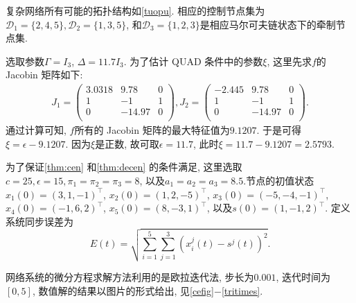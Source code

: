     复杂网络所有可能的拓扑结构如\autoref{tuopu}. 相应的控制节点集为$\mathcal{D}_1=\{2,4,5\}, \mathcal{D}_2=\{1,3,5\}$, 和$\mathcal{D}_3=\{1,2,3\}$是相应马尔可夫链状态下的牵制节点集.

    选取参数$\Gamma=I_3$, $\Delta=11.7I_3$. 为了估计 QUAD 条件中的参数$\xi$, 这里先求$f$的 Jacobin 矩阵如下:
        \begin{align*}
        J_1=\left(
              \begin{array}{ccc}
                3.0318 & 9.78 & 0 \\
                1 & -1 & 1 \\
                0 & -14.97 & 0 \\
              \end{array}
            \right),
        J_2=\left(
              \begin{array}{ccc}
                -2.445 & 9.78 & 0 \\
                1 & -1 & 1 \\
                0 & -14.97 & 0 \\
              \end{array}
            \right).
        \end{align*}
        通过计算可知, $f$所有的 Jacobin 矩阵的最大特征值为$9.1207$. 于是可得$\xi=\epsilon-9.1207$. 因为$\xi$是正数, 故可取$\epsilon=11.7$, 此时$\xi=11.7-9.1207=2.5793$.

    为了保证\autoref{thm:cen} 和\autoref{thm:decen} 的条件满足, 这里选取$c=25, \epsilon=15, \pi_1=\pi_2=\pi_3=8$, 以及$a_1=a_2=a_3=8.5$.节点的初值状态$x_1(0)=(3,1,-1)^\top$, $x_2(0)=(1,2,-5)^\top$, $x_3(0)=(-5,-4,-1)^\top$, $x_4(0)=(-1,6, 2)^\top$, $x_5(0)=(8,-3,1)^\top$, 以及$s(0)=(1,-1,2)^\top$.
    定义系统同步误差为
        $$E(t)=\sqrt{\sum_{i=1}^5\sum_{j=1}^3(x_i^j(t)-s^j(t))^2}.$$

    网络系统的微分方程求解方法利用的是欧拉迭代法, 步长为$0.001$, 迭代时间为$[0, 5]$, 数值解的结果以图片的形式给出, 见\autoref{cefig}$-$\autoref{tritimes}.

